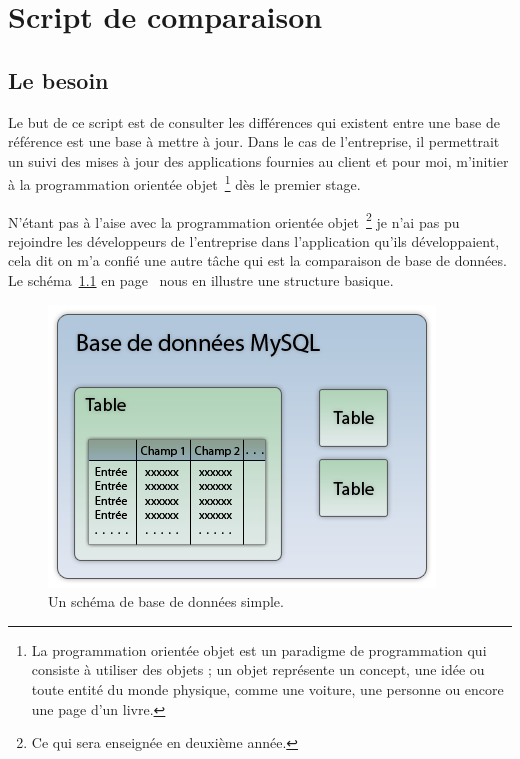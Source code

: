 \chapter{Script de comparaison} %
\label{cha:Script de comparaison}

\section{Le besoin} %
\label{sec:Le besoin}

Le but de ce script est de consulter les différences qui existent entre une
base de référence est une base à mettre à jour. Dans le cas de l'entreprise, il
permettrait un suivi des mises à jour des applications fournies au client et
pour moi, m'initier à la programmation orientée objet\, \footnote{La
programmation orientée objet est un paradigme de programmation qui consiste à
utiliser des objets ; un objet représente un concept, une idée ou toute entité
du monde physique, comme une voiture, une personne ou encore une page d'un
livre.} dès le premier stage.

N'étant pas à l'aise avec la programmation orientée objet\, \footnote{Ce qui
sera enseignée en deuxième année.} je n'ai pas pu rejoindre les développeurs de
l'entreprise dans l'application qu'ils développaient, cela dit on m'a confié
une autre tâche qui est la comparaison de base de données. Le schéma~\ref{bdd}
en page~\pageref{bdd} nous en illustre une structure basique.

\begin{figure}
\begin{center}
\includegraphics[scale=0.7]{images/bdd.png}
\end{center}
\caption{Un schéma de base de données simple.}
\label{bdd}
\end{figure}

